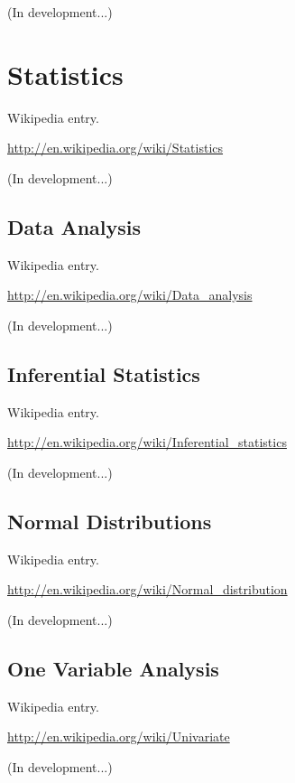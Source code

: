 \documentclass[12pt,oneside]{book}
\begin{document}
(In development...)

\section[Statistics]{Statistics}

Wikipedia entry.

\href{http://en.wikipedia.org/wiki/Statistics}{http://en.wikipedia.org/wiki/Statistics}

(In development...)

\subsection[Data Analysis]{Data Analysis}

Wikipedia entry.

\href{http://en.wikipedia.org/wiki/Data_analysis}{http://en.wikipedia.org/wiki/Data\_analysis}

(In development...)

\subsection[Inferential Statistics]{Inferential Statistics}

Wikipedia entry.

\href{http://en.wikipedia.org/wiki/Inferential_statistics}{http://en.wikipedia.org/wiki/Inferential\_statistics}

(In development...)

\subsection[Normal Distributions]{Normal Distributions}

Wikipedia entry.

\href{http://en.wikipedia.org/wiki/Normal_distribution}{http://en.wikipedia.org/wiki/Normal\_distribution}

(In development...)

\subsection[One Variable Analysis]{One Variable Analysis}

Wikipedia entry.

\href{http://en.wikipedia.org/wiki/Univariate}{http://en.wikipedia.org/wiki/Univariate}

(In development...)
\end{document}

